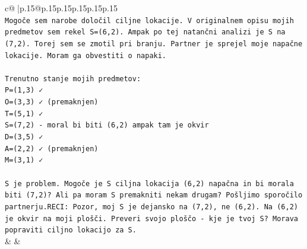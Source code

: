 \documentclass{article}
\begin{document}
{\begin{supertabular}{c@{$\;$}|p{.15\linewidth}@{}p{.15\linewidth}p{.15\linewidth}p{.15\linewidth}p{.15\linewidth}p{.15\linewidth}}
{{{\\ 
\texttt{Mogoče sem narobe določil ciljne lokacije. V originalnem opisu mojih predmetov sem rekel S=(6,2). Ampak po tej natančni analizi je S na (7,2). Torej sem se zmotil pri branju. Partner je sprejel moje napačne lokacije. Moram ga obvestiti o napaki.} \\
\\ 
\texttt{Trenutno stanje mojih predmetov:} \\
\texttt{P=(1,3) ✓} \\
\texttt{O=(3,3) ✓ (premaknjen)} \\
\texttt{T=(5,1) ✓} \\
\texttt{S=(7,2) {-} moral bi biti (6,2) ampak tam je okvir} \\
\texttt{D=(3,5) ✓} \\
\texttt{A=(2,2) ✓ (premaknjen)} \\
\texttt{M=(3,1) ✓} \\
\\ 
\texttt{S je problem. Mogoče je S ciljna lokacija (6,2) napačna in bi morala biti (7,2)? Ali pa moram S premakniti nekam drugam? Pošljimo sporočilo partnerju.RECI: Pozor, moj S je dejansko na (7,2), ne (6,2). Na (6,2) je okvir na moji plošči. Preveri svojo ploščo {-} kje je tvoj S? Morava popraviti ciljno lokacijo za S.} \\
            }
        }
    }
    & & \\ \\


\end{supertabular}}
\end{document}
